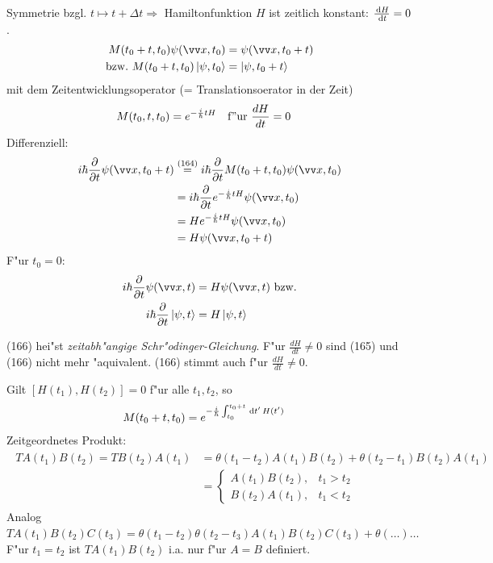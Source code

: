 \documentclass[a4paper]{scrartcl}
\newcommand{\dd}{\ensuremath \, \mathrm{d}}
\begin{document}
{Symmetrie bzgl. $t \mapsto t + \Delta t \Longrightarrow$ Hamiltonfunktion $H$ ist zeitlich konstant: $\frac { \dd H }{\dd t} = 0$.
\begin{align}
\begin{split}
M(t_0+t, t_0) \psi(\vv x, t_0) & = \psi(\vv x, t_0 + t) \\
\mathrm{bzw. \ } M(t_0 + t, t_0) \ket{ \psi, t_0} & = \ket{ \psi, t_0+t}
\end{split}
\end{align}
mit dem Zeitentwicklungsoperator (= Translationsoerator in der Zeit)
\begin{align}
M(t_0,t, t_0) & = e^{- \frac i \hbar t H} \quad \mathrm{f"ur \ } \frac{d H}{dt} = 0
\end{align}
Differenziell:
\begin{align*}
i \hbar \frac \partial {\partial t} \psi(\vv x, t_0 + t) & \stackrel{(164)}= i \hbar \frac \partial {\partial t} M(t_0+t, t_0) \psi(\vv x, t_0) \\
& = i \hbar \frac \partial {\partial t} e^{-\frac i \hbar t H} \psi( \vv x, t_0) \\
& = H e^{-\frac i \hbar t H} \psi(\vv x, t_0) \\
& = H \psi(\vv x, t_0 + t)
\end{align*}
F"ur $t_0 =0$:
\begin{align}
\begin{split}
i \hbar \frac \partial {\partial t} \psi(\vv x, t) & = H \psi( \vv x, t) \ \mathrm{bzw.} \\
i \hbar \frac \partial {\partial t} \ket{ \psi, t} & = H \ket{ \psi, t}
\end{split}
\end{align}

(166) hei"st \emph{zeitabh"angige Schr"odinger-Gleichung}. F"ur $\frac {dH}{dt} \neq 0$ sind (165) und (166) nicht mehr "aquivalent. (166) stimmt auch f"ur $\frac{dH}{dt} \neq 0$.

Gilt $[ H(t_1), H(t_2) ] = 0$ f"ur alle $t_1, t_2$, so 
\begin{align}
M(t_0+t, t_0) & = e^{-\frac i \hbar \int_{t_0}^{t_0+ t} \dd t' \, H(t')}
\end{align}
Zeitgeordnetes Produkt:
\begin{align}
\begin{split}
T A(t_1) B(t_2) = T B(t_2) A(t_1) & = \theta (t_1 - t_2) A(t_1) B(t_2) + \theta(t_2-t_1) B(t_2) A(t_1) \\
& = \begin{cases} A(t_1) B(t_2), & t_1 > t_2 \\
B(t_2) A(t_1), & t_1 < t_2 \end{cases}
\end{split}
\end{align}
Analog $T A(t_1) B(t_2) C(t_3) = \theta(t_1 - t_2) \theta(t_2 - t_3) A(t_1) B(t_2) C(t_3) + \theta(\ldots) \ldots$
F"ur $t_1 = t_2$ ist $T A(t_1) B(t_2)$ i.a. nur f"ur $A=B$ definiert.


}
\end{document}
